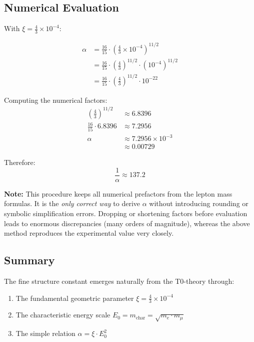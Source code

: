 \documentclass[12pt,a4paper]{article}
\newcommand{\xipar}{\xi}  %
\begin{document}
\subsection{Numerical Evaluation}

With $\xipar = \frac{4}{3} \times 10^{-4}$:

\begin{align}
	\alpha &= \frac{16}{15} \cdot \left( \frac{4}{3} \times 10^{-4} \right)^{11/2} \\
	&= \frac{16}{15} \cdot \left( \frac{4}{3} \right)^{11/2} \cdot (10^{-4})^{11/2} \\
	&= \frac{16}{15} \cdot \left( \frac{4}{3} \right)^{11/2} \cdot 10^{-22}
\end{align}

Computing the numerical factors:
\begin{align}
	\left( \frac{4}{3} \right)^{11/2} &\approx 6.8396 \\
	\frac{16}{15} \cdot 6.8396 &\approx 7.2956 \\
	\alpha &\approx 7.2956 \times 10^{-3} \\
	&\approx 0.00729
\end{align}

Therefore:
\begin{equation}
	\boxed{\frac{1}{\alpha} \approx 137.2}
\end{equation}

\textbf{Note:} This procedure keeps all numerical prefactors from the lepton mass formulas. It is the \textit{only correct way} to derive $\alpha$ without introducing rounding or symbolic simplification errors. Dropping or shortening factors before evaluation leads to enormous discrepancies (many orders of magnitude), whereas the above method reproduces the experimental value very closely.

\subsection{Summary}

The fine structure constant emerges naturally from the T0-theory through:
\begin{enumerate}
	\item The fundamental geometric parameter $\xipar = \frac{4}{3} \times 10^{-4}$
	\item The characteristic energy scale $E_0 = m_{\text{char}} = \sqrt{m_e \cdot m_\mu}$
	\item The simple relation $\alpha = \xipar \cdot E_0^2$
\end{enumerate}
\end{document}
